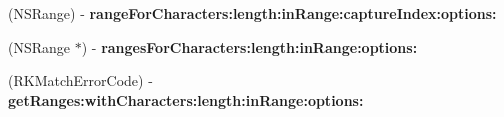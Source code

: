 \begin{DoxyCompactItemize}
\item 
\hypertarget{interface_r_k_regex_a9da47043b99002e9b5b3cb60e34a7d19}{(N\-S\-Range) -\/ {\bfseries range\-For\-Characters\-:length\-:in\-Range\-:capture\-Index\-:options\-:}}\label{interface_r_k_regex_a9da47043b99002e9b5b3cb60e34a7d19}

\item 
\hypertarget{interface_r_k_regex_a2b084eb136061edc6a39253709d145d3}{(N\-S\-Range $\ast$) -\/ {\bfseries ranges\-For\-Characters\-:length\-:in\-Range\-:options\-:}}\label{interface_r_k_regex_a2b084eb136061edc6a39253709d145d3}

\item 
\hypertarget{interface_r_k_regex_a81365eb7d809043ed0a1a27ec99c09c7}{(R\-K\-Match\-Error\-Code) -\/ {\bfseries get\-Ranges\-:with\-Characters\-:length\-:in\-Range\-:options\-:}}\label{interface_r_k_regex_a81365eb7d809043ed0a1a27ec99c09c7}

\end{DoxyCompactItemize}
